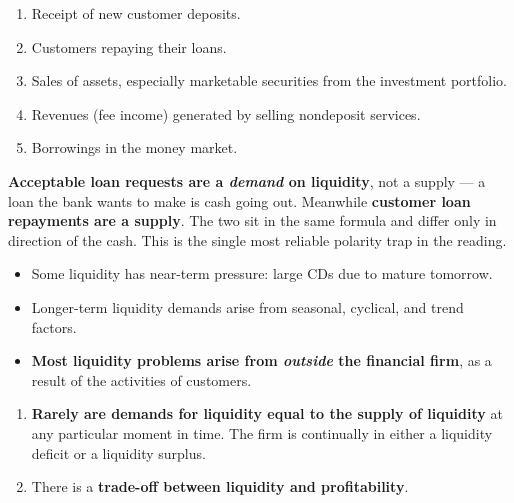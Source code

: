 \begin{enumerate}
\item Receipt of new customer deposits.
\item Customers repaying their loans.
\item Sales of assets, especially marketable securities from the investment portfolio.
\item Revenues (fee income) generated by selling nondeposit services.
\item Borrowings in the money market.
\end{enumerate}

\begin{lrtrapbox}
\textbf{Acceptable loan requests are a \emph{demand} on liquidity}, not a supply — a loan the bank wants to make is cash going out. Meanwhile \textbf{customer loan repayments are a supply}. The two sit in the same formula and differ only in direction of the cash. This is the single most reliable polarity trap in the reading.
\end{lrtrapbox}

\begin{lrkeybox}
\begin{itemize}
\item Some liquidity has near-term pressure: large CDs due to mature tomorrow.
\item Longer-term liquidity demands arise from seasonal, cyclical, and trend factors.
\item \textbf{Most liquidity problems arise from \emph{outside} the financial firm}, as a result of the activities of customers.
\end{itemize}
\end{lrkeybox}

\begin{lrkeybox}
\begin{enumerate}
\item \textbf{Rarely are demands for liquidity equal to the supply of liquidity} at any particular moment in time. The firm is continually in either a liquidity deficit or a liquidity surplus.
\item There is a \textbf{trade-off between liquidity and profitability}.
\end{enumerate}
\end{lrkeybox}


